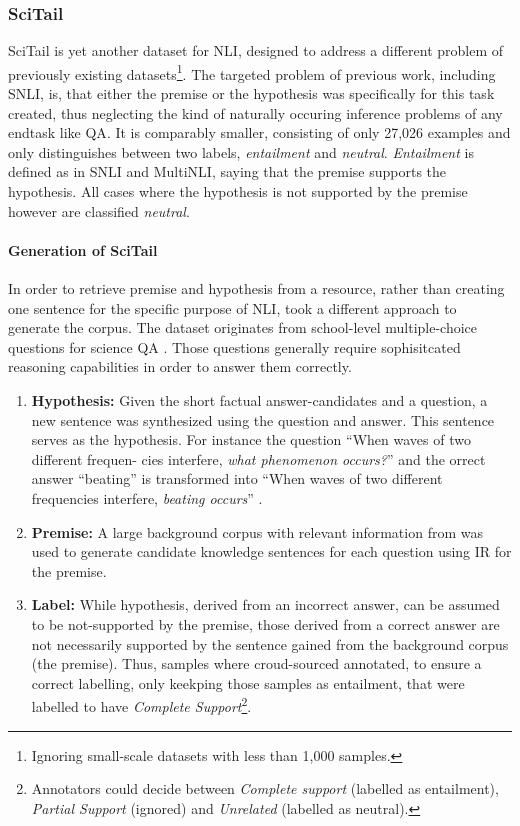\subsubsection{SciTail}
SciTail \citep{scitail} is yet another dataset for \ac{NLI}, designed to address a different problem of previously existing datasets\footnote{Ignoring small-scale datasets with less than 1,000 samples.}. The targeted problem of previous work, including \ac{SNLI}, is, that either the premise or the hypothesis was specifically for this task created, thus neglecting the kind of naturally occuring inference problems of any endtask like \ac{QA}. It is comparably smaller, consisting of only 27,026 examples and only distinguishes between two labels, \textit{entailment} and \textit{neutral}. \textit{Entailment} is defined as in \ac{SNLI} and \ac{MultiNLI}, saying that the premise supports the hypothesis. All cases where the hypothesis is not supported by the premise however are classified \textit{neutral}.

\paragraph*{Generation of SciTail}
In order to retrieve premise and hypothesis from a resource, rather than creating one sentence for the specific purpose of \ac{NLI}, \cite{scitail} took a different approach to generate the corpus. The dataset originates from school-level multiple-choice questions for science \ac{QA} \citep{welbl2017crowdsourcing}. Those questions generally require sophisitcated reasoning capabilities in order to answer them correctly. 
\begin{enumerate}
\item \textbf{Hypothesis:} Given the short factual answer-candidates and a question, a new sentence was synthesized using the question and answer. This sentence serves as the hypothesis. For instance the question ``When waves of two different frequen-
cies interfere, \textit{what phenomenon occurs?}'' and the orrect answer ``beating'' is transformed into ``When waves of two different frequencies interfere, \textit{beating occurs}'' \citep{scitail}.
\item \textbf{Premise:} A large background corpus with relevant information from \cite{clark2016combining} was used to generate candidate knowledge sentences for each question using \ac{IR} for the premise.
\item \textbf{Label:} While hypothesis, derived from an incorrect answer, can be assumed to be not-supported by the premise, those derived from a correct answer are not necessarily supported by the sentence gained from the background corpus (the premise). Thus, samples where croud-sourced annotated, to ensure a correct labelling, only keekping those samples as entailment, that were labelled to have \textit{Complete Support}\footnote{Annotators could decide between \textit{Complete support} (labelled as entailment), \textit{Partial Support} (ignored) and \textit{Unrelated} (labelled as neutral).}.
\end{enumerate}


